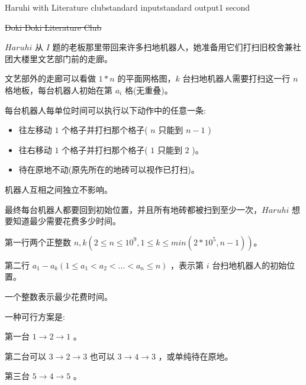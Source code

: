 \begin{problem}{Haruhi with Literature club}{standard input}{standard output}{1 second}

\sout{Doki Doki Literature Club}

$Haruhi$ 从 $I$ 题的老板那里带回来许多扫地机器人，她准备用它们打扫旧校舍兼社团大楼里文艺部门前的走廊。

文艺部外的走廊可以看做 $1*n$ 的平面网格图，$k$ 台扫地机器人需要打扫这一行 $n$ 格地板，每台机器人初始在第 $a_i$ 格(无重叠)。

每台机器人每单位时间可以执行以下动作中的任意一条:
\begin{itemize}
\item 往左移动 $1$ 个格子并打扫那个格子( $n$ 只能到 $n-1$ )
\item 往右移动 $1$ 个格子并打扫那个格子( $1$ 只能到 $2$ )。
\item 待在原地不动(原先所在的地砖可以视作已打扫)。
\end{itemize}

机器人互相之间独立不影响。

最终每台机器人都要回到初始位置，并且所有地砖都被扫到至少一次，$Haruhi$ 想要知道最少需要花费多少时间。

\InputFile

第一行两个正整数 $n,k(2 \leq n \leq 10^9,1 \leq k \leq min(2*10^5,n-1))$。

第二行 $a_1-a_k(1 \leq a_1 \lt a_2 \lt \dots \lt a_n \leq n)$ ，表示第 $i$ 台扫地机器人的初始位置。

\OutputFile

一个整数表示最少花费时间。

\Example
\begin{example}
%
\end{example}

\Note

一种可行方案是:

第一台 $1 \to 2 \to 1$ 。

第二台可以 $3 \to 2 \to 3$ 也可以 $3 \to 4 \to 3$ ，或单纯待在原地。

第三台 $5 \to 4 \to 5$ 。

\end{problem}
